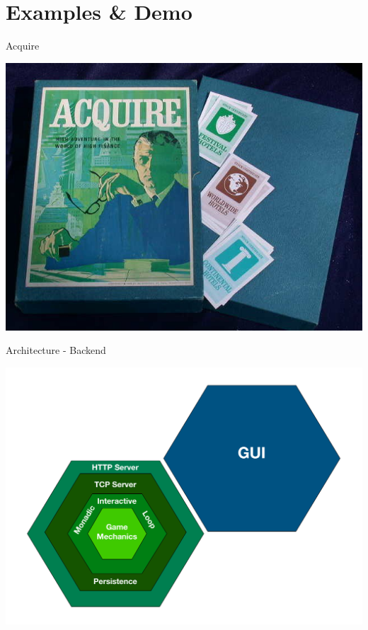 \part{Examples \& Demo}

\begin{frame}[fragile]{Acquire}
  \begin{center}
    \includegraphics[height=.8\textheight]{./images/acquire-boardgame.jpg}
  \end{center}
\end{frame}

\begin{frame}[fragile]{Architecture - Backend}
  \begin{center}
    \includegraphics[height=.8\textheight]{./images/archi-back.pdf}
  \end{center}
\end{frame}

